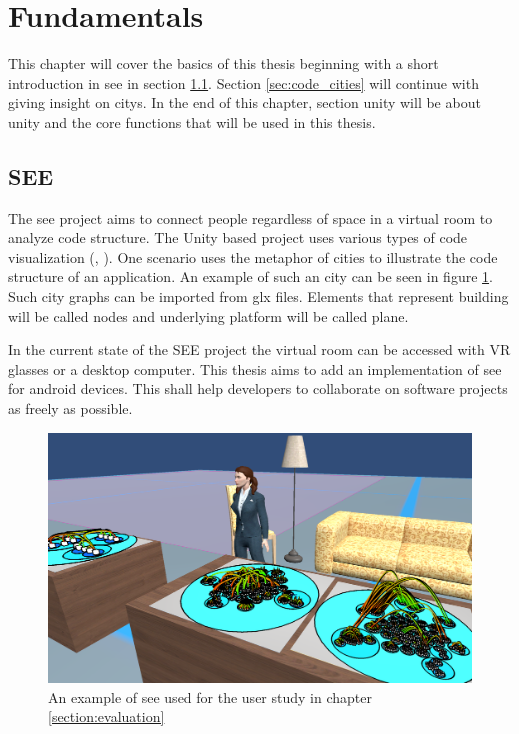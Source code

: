 \section{Fundamentals}
\label{sec:fundamentals}
This chapter will cover the basics of this thesis beginning with a short introduction in \gls{see} in section \ref{sec:see}.
Section \ref{sec:code_cities} will continue with giving insight on \glspl{city}. 
In the end of this chapter, section \gls{unity} will be about \gls{unity} and the core functions that will be used in this thesis.

\subsection{SEE}
\label{sec:see}
The \gls{see} project aims to connect people regardless of space in a virtual room to analyze code structure. 
The Unity based project uses various types of code visualization (\cite{koschke}, \cite{DBLP:conf/iwsc/KoschkeS21}). 
One scenario uses the metaphor of cities to illustrate the code structure of an application.
An example of such an \gls{city} can be seen in figure \ref{fig:see_example}.
Such city graphs can be imported from \gls{glx} files.
Elements that represent building will be called \glspl{node} and underlying platform will be called \gls{plane}.

In the current state of the SEE project the virtual room can be accessed with VR glasses or a desktop computer.
This thesis aims to add an implementation of \gls{see} for \gls{android} devices.
This shall help developers to collaborate on software projects as freely as possible.
\begin{figure}[htb]
    \centering
    \includegraphics[width=1\textwidth]{Fundamentals/img/SEE.png}
    \caption{An example of \gls{see} used for the user study in chapter \ref{section:evaluation}}
    \label{fig:see_example}
\end{figure}

